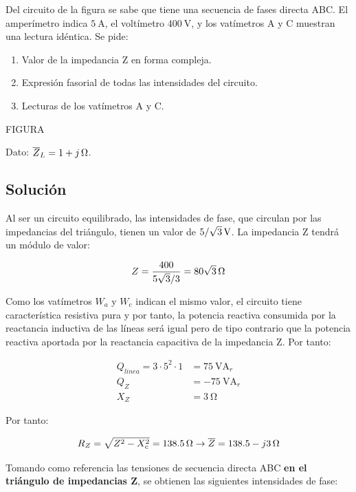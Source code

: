 Del circuito de la figura se sabe que tiene una secuencia de fases
directa ABC. El amperímetro indica $\SI{5}{\ampere}$, el voltímetro
$\SI{400}{\volt}$, y los vatímetros A y C muestran una lectura
idéntica. Se pide:

\begin{enumerate}
\item Valor de la impedancia Z en forma compleja.
\item Expresión fasorial de todas las intensidades del circuito.
\item Lecturas de los vatímetros A y C.
\end{enumerate}

\begin{center}
  FIGURA
\end{center}

Dato: $\overline{Z}_L = \SI[parse-numbers = false]{1 + j}{\ohm}$.

\subsection*{Solución}

Al ser un circuito equilibrado, las intensidades de fase, que
circulan por las impedancias del triángulo, tienen un valor de
$\SI[parse-numbers=false]{5/\sqrt{3}}{\volt}$. La impedancia Z
tendrá un módulo de valor:

\[
  Z = \frac{400}{5\sqrt{3}/3} =
  \SI[parse-numbers=false]{80\sqrt{3}}{\ohm}
\]

Como los vatímetros $W_a$ y $W_c$ indican el mismo valor, el
circuito tiene característica resistiva pura y por tanto, la
potencia reactiva consumida por la reactancia inductiva de las
líneas será igual pero de tipo contrario que la potencia reactiva
aportada por la reactancia capacitiva de la impedancia Z. Por tanto:

\begin{align*}
  Q_{linea} = 3 \cdot 5^2 \cdot 1 &= \SI{75}{\volt\ampere}_r\\
  Q_Z &= -\SI{75}{\volt\ampere}_r\\
  X_Z &= \SI{3}{\ohm}
\end{align*}

Por tanto:

\[
  R_Z = \sqrt{Z^2 - X_c^2} = \SI{138.5}{\ohm} \rightarrow \overline{Z} = \SI[parse-numbers=false]{138.5 - j3}{\ohm}
\]

Tomando como referencia las tensiones de secuencia directa ABC
\textbf{en el triángulo de impedancias Z}, se obtienen las siguientes
intensidades de fase:

